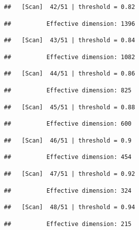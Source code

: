 \documentclass[
]{book}
\begin{document}
\begin{verbatim}
##   [Scan]  42/51 | threshold = 0.82
\end{verbatim}

\begin{verbatim}
##          Effective dimension: 1396
\end{verbatim}

\begin{verbatim}
##   [Scan]  43/51 | threshold = 0.84
\end{verbatim}

\begin{verbatim}
##          Effective dimension: 1082
\end{verbatim}

\begin{verbatim}
##   [Scan]  44/51 | threshold = 0.86
\end{verbatim}

\begin{verbatim}
##          Effective dimension: 825
\end{verbatim}

\begin{verbatim}
##   [Scan]  45/51 | threshold = 0.88
\end{verbatim}

\begin{verbatim}
##          Effective dimension: 600
\end{verbatim}

\begin{verbatim}
##   [Scan]  46/51 | threshold = 0.9
\end{verbatim}

\begin{verbatim}
##          Effective dimension: 454
\end{verbatim}

\begin{verbatim}
##   [Scan]  47/51 | threshold = 0.92
\end{verbatim}

\begin{verbatim}
##          Effective dimension: 324
\end{verbatim}

\begin{verbatim}
##   [Scan]  48/51 | threshold = 0.94
\end{verbatim}

\begin{verbatim}
##          Effective dimension: 215
\end{verbatim}
\end{document}
